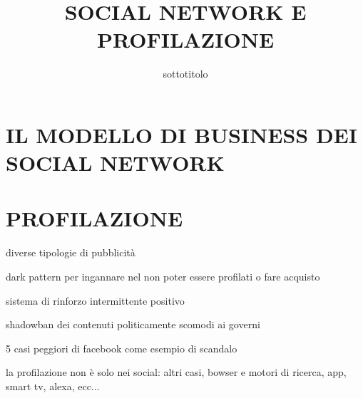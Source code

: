 \documentclass[aspectratio=1610]{beamer}
\title{SOCIAL NETWORK E PROFILAZIONE}
\subtitle{sottotitolo}
\date{}
\institute{\textit{
        Fonti:
        \begin{itemize}
            \item[-] \href{https://www.wired.it/attualita/tech/2020/09/24/social-dilemma-dopamina-effetto-smartphone-cervello/}{Wired: Andrea Daniele Signorelli}
            \item[-] \href{www.nomefonte2.it}{NOME FONTE 2}
        \end{itemize}
    }
}
\begin{document}
\begin{frame}
    \titlepage
\end{frame}

\section{IL MODELLO DI BUSINESS DEI SOCIAL NETWORK}

\section{PROFILAZIONE}


diverse tipologie di pubblicità

dark pattern per ingannare nel non poter essere profilati o fare acquisto

sistema di rinforzo intermittente positivo

shadowban dei contenuti politicamente scomodi ai governi

5 casi peggiori di facebook come esempio di scandalo

la profilazione non è solo nei social: altri casi, bowser e motori di ricerca, app, smart tv, alexa, ecc...
\end{document}
